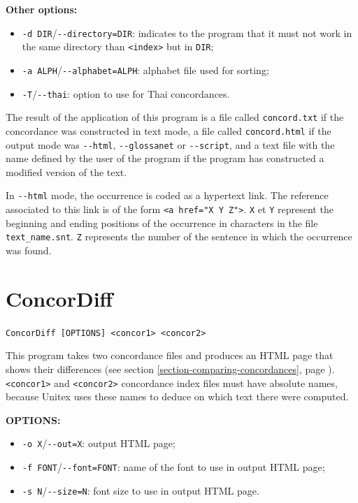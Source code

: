 \bigskip
\noindent \textbf{Other options:}
\begin{itemize}
  \item \verb+-d DIR+/\verb+--directory=DIR+: indicates to the program that
  it must not work in the same directory than \verb+<index>+ but in \verb+DIR+;
  \item \verb+-a ALPH+/\verb+--alphabet=ALPH+: alphabet file used for sorting;
  \item \verb+-T+/\verb+--thai+: option to use for Thai concordances.
\end{itemize}

\bigskip
\noindent The result of the application of this program is a file called \verb+concord.txt+
if the concordance was constructed in text mode, a file called
\verb+concord.html+ if the output mode was \verb+--html+, \verb+--glossanet+ or
\verb$--script$, and a text file with the name defined by the user of the program 
if the program has constructed a modified version of the text.

\bigskip
\noindent In \verb+--html+ mode, the occurrence is coded as a hypertext link. The reference
associated to this link is of the form \verb+<a href="X Y Z">+. \verb+X+ et
\verb+Y+ represent the beginning and ending positions of the occurrence in
characters in the file \verb+text_name.snt+. \verb+Z+ represents the number of
the sentence in which the occurrence was found.






\section{ConcorDiff}
\verb+ConcorDiff [OPTIONS] <concor1> <concor2>+

\bigskip
\noindent This program takes two concordance files and produces an HTML page
that shows their differences (see section
\ref{section-comparing-concordances}, page \pageref{section-comparing-concordances}). 
\verb+<concor1>+ and \verb+<concor2>+ concordance index files must 
have absolute names, because Unitex uses these names to deduce on which text
there were computed.

\bigskip
\noindent \textbf{OPTIONS:}
\begin{itemize}
  \item \verb+-o X+/\verb+--out=X+: output HTML page;
  \item \verb+-f FONT+/\verb+--font=FONT+: name of the font to use in output
  HTML page;
  \item \verb+-s N+/\verb+--size=N+: font size to use in output HTML page.
\end{itemize}








